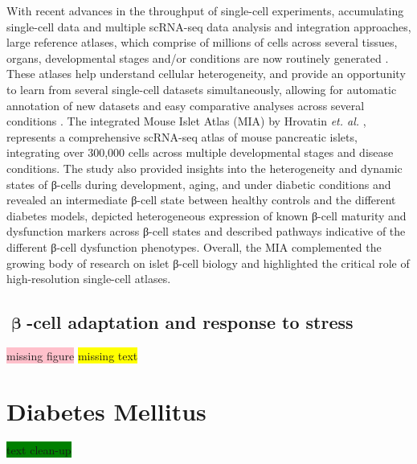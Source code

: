 With recent advances in the throughput of single-cell experiments, accumulating single-cell data and multiple scRNA-seq data analysis and integration approaches, large reference atlases, which comprise of millions of cells across several tissues, organs, developmental stages and/or conditions are now routinely generated \textbf{\cite{regev_human_nodate}}. These atlases help understand cellular heterogeneity, and provide an opportunity to learn from several single-cell datasets simultaneously, allowing for automatic annotation of new datasets and easy comparative analyses across several conditions \textbf{\cite{rood_impact_,lotfollahi_mapping_2021}}. The integrated Mouse Islet Atlas (MIA) by Hrovatin \textit{et. al.} \textbf{\cite{hrovatin_delineating_2023}}, represents a comprehensive scRNA-seq atlas of mouse pancreatic islets, integrating over 300,000 cells across multiple developmental stages and disease conditions. The study also provided insights into the heterogeneity and dynamic states of β-cells during development, aging, and under diabetic conditions and revealed an intermediate β-cell state between healthy controls and the different diabetes models, depicted heterogeneous expression of known β-cell maturity and dysfunction markers across β-cell states and described pathways indicative of the different  β-cell dysfunction phenotypes. Overall, the MIA complemented the growing body of research on islet β-cell biology and highlighted the critical role of high-resolution single-cell atlases. 

\subsection{\( \mathbf{\upbeta} \)-cell adaptation and response to stress}
\colorbox{pink}{missing figure} \colorbox{yellow}{missing text} \\

\clearpage
\section{Diabetes Mellitus}

\colorbox{green}{text clean-up} \\

